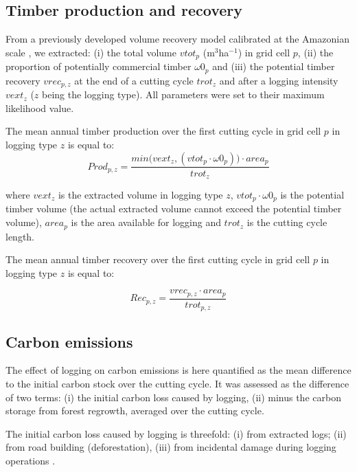 \documentclass{article}
\begin{document}
\subsection{Timber production and recovery}

From a previously developed volume recovery model calibrated at the Amazonian scale \cite{Piponiotc}, we extracted: (i) the total volume $vtot_p$ (m$^3$ha$^{-1}$) in grid cell $p$, (ii) the proportion of potentially commercial timber $\omega 0_p$ and (iii) the potential timber recovery $vrec_{p,z}$ at the end of a cutting cycle $trot_z$ and after a logging intensity $vext_z$ ($z$ being the logging type). All parameters were set to their maximum likelihood value.

The mean annual timber production over the first cutting cycle in grid cell $p$ in logging type $z$ is equal to: 
\begin{equation}
\label{eq:prod}
    Prod_{p,z}  =  \frac{min\big(vext_z, (vtot_p\cdot \omega 0_p) \big) \cdot area_p}{trot_z}
\end{equation}

where $vext_z$ is the extracted volume in logging type $z$, $vtot_p\cdot \omega 0_p$ is the potential timber volume (the actual extracted volume cannot exceed the potential timber volume), $area_p$ is the area available for logging and $trot_z$ is the cutting cycle length.

The mean annual timber recovery over the first cutting cycle in grid cell $p$ in logging type $z$ is equal to: 

\begin{equation}
\label{eq:rec}
    Rec_{p,z} = \frac{vrec_{p,z}\cdot area_p}{trot_{p,z}}
\end{equation}

\subsection{Carbon emissions}

The effect of logging on carbon emissions is here quantified as the mean difference to the initial carbon stock over the cutting cycle. It was assessed as the difference of two terms: (i) the initial carbon loss caused by logging, (ii) minus the carbon storage from forest regrowth, averaged over the cutting cycle. 

The initial carbon loss caused by logging is threefold: (i) from extracted logs; (ii) from road building (deforestation), (iii) from incidental damage during logging operations \cite{Piponiot2016}. 
\end{document}
